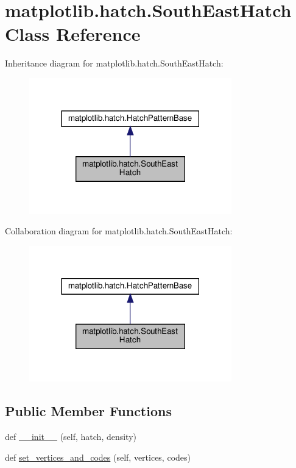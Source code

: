 \hypertarget{classmatplotlib_1_1hatch_1_1SouthEastHatch}{}\section{matplotlib.\+hatch.\+South\+East\+Hatch Class Reference}
\label{classmatplotlib_1_1hatch_1_1SouthEastHatch}


Inheritance diagram for matplotlib.\+hatch.\+South\+East\+Hatch\+:
\nopagebreak
\begin{figure}[H]
\begin{center}
\leavevmode
\includegraphics[width=249pt]{classmatplotlib_1_1hatch_1_1SouthEastHatch__inherit__graph}
\end{center}
\end{figure}


Collaboration diagram for matplotlib.\+hatch.\+South\+East\+Hatch\+:
\nopagebreak
\begin{figure}[H]
\begin{center}
\leavevmode
\includegraphics[width=249pt]{classmatplotlib_1_1hatch_1_1SouthEastHatch__coll__graph}
\end{center}
\end{figure}
\subsection*{Public Member Functions}
\begin{DoxyCompactItemize}
\item 
def \hyperlink{classmatplotlib_1_1hatch_1_1SouthEastHatch_ae9527c6cb32fe18d3c96002afa55c509}{\+\_\+\+\_\+init\+\_\+\+\_\+} (self, hatch, density)
\item 
def \hyperlink{classmatplotlib_1_1hatch_1_1SouthEastHatch_a2d1c1fcc3465ff9d584515e5110a3873}{set\+\_\+vertices\+\_\+and\+\_\+codes} (self, vertices, codes)
\end{DoxyCompactItemize}
